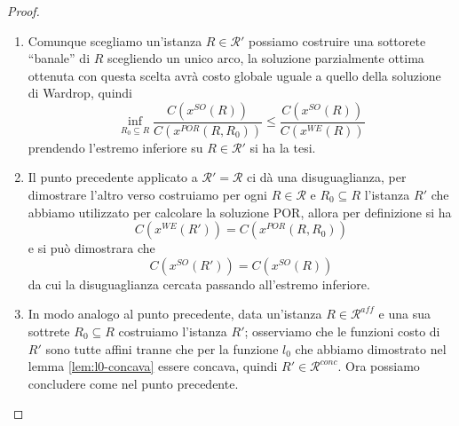 \documentclass[a4paper]{article}
\theoremstyle{plain}
\theoremstyle{definition}
\theoremstyle{remark}
\newcommand{\pa}[1]{\left(#1\right)}
\begin{document}
\begin{proof}
  \begin{enumerate}
  \item Comunque scegliamo un'istanza $R\in \mathcal{R'}$ possiamo
    costruire una sottorete ``banale'' di $R$ scegliendo un unico
    arco, la soluzione parzialmente ottima ottenuta con questa scelta
    avrà costo globale uguale a quello della soluzione di Wardrop,
    quindi
    \[ \inf _{R_0\subseteq R}
      \frac{C\pa{x^{SO}(R)}}{C\pa{x^{POR}(R,R_0)}} \le
      \frac{C\pa{x^{SO}(R)}}{C\pa{x^{WE}(R)}} \]
    prendendo l'estremo inferiore su $R\in \mathcal{R}'$ si ha la
    tesi.
  \item Il punto precedente applicato a $\mathcal{R'} =\mathcal{R}$ ci
    dà una disuguaglianza, per dimostrare l'altro verso costruiamo per
    ogni $R\in \mathcal{R}$ e $R_0\subseteq R$ l'istanza $R'$ che
    abbiamo utilizzato per calcolare la soluzione POR, allora per
    definizione si ha
    \[ C\pa{x^{WE}\pa{R'}} = C\pa{x^{POR}\pa{R,R_0}} \]
    e si può dimostrara che
    \[ C\pa{x^{SO}\pa{R'}} = C\pa{x^{SO}\pa{R}} \]
    da cui la disuguaglianza cercata passando all'estremo inferiore.
  \item In modo analogo al punto precedente, data un'istanza $R\in
    \mathcal{R}^{aff}$ e una sua sottrete $R_0\subseteq R$ costruiamo
    l'istanza $R'$; osserviamo che le funzioni costo di $R'$ sono
    tutte affini tranne che per la funzione $l_0$ che abbiamo
    dimostrato nel lemma \ref{lem:l0-concava} essere concava, quindi
    $R'\in \mathcal{R}^{conc}$. Ora possiamo concludere come nel punto
    precedente.
  \end{enumerate}
\end{proof}
\end{document}
